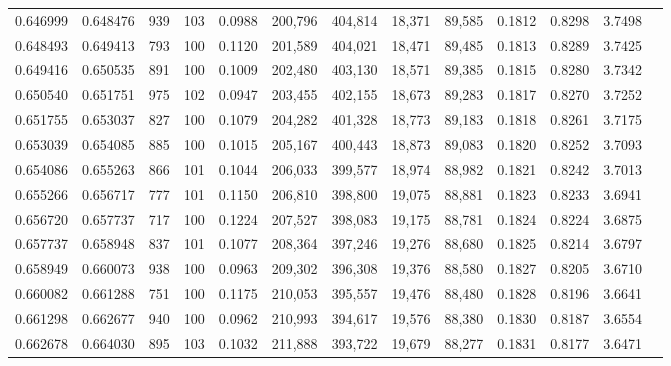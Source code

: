 \begin{tabular}{rrrrrrrrrrrrr}
0.646999 & 0.648476 &   939 & 103 &                                     0.0988 & 200,796 & 404,814 &  18,371 &  89,585 & 0.1812 & 0.8298 & 3.7498 \\
0.648493 & 0.649413 &   793 & 100 &                                     0.1120 & 201,589 & 404,021 &  18,471 &  89,485 & 0.1813 & 0.8289 & 3.7425 \\
0.649416 & 0.650535 &   891 & 100 &                                     0.1009 & 202,480 & 403,130 &  18,571 &  89,385 & 0.1815 & 0.8280 & 3.7342 \\
0.650540 & 0.651751 &   975 & 102 &                                     0.0947 & 203,455 & 402,155 &  18,673 &  89,283 & 0.1817 & 0.8270 & 3.7252 \\
0.651755 & 0.653037 &   827 & 100 &                                     0.1079 & 204,282 & 401,328 &  18,773 &  89,183 & 0.1818 & 0.8261 & 3.7175 \\
0.653039 & 0.654085 &   885 & 100 &                                     0.1015 & 205,167 & 400,443 &  18,873 &  89,083 & 0.1820 & 0.8252 & 3.7093 \\
0.654086 & 0.655263 &   866 & 101 &                                     0.1044 & 206,033 & 399,577 &  18,974 &  88,982 & 0.1821 & 0.8242 & 3.7013 \\
0.655266 & 0.656717 &   777 & 101 &                                     0.1150 & 206,810 & 398,800 &  19,075 &  88,881 & 0.1823 & 0.8233 & 3.6941 \\
0.656720 & 0.657737 &   717 & 100 &                                     0.1224 & 207,527 & 398,083 &  19,175 &  88,781 & 0.1824 & 0.8224 & 3.6875 \\
0.657737 & 0.658948 &   837 & 101 &                                     0.1077 & 208,364 & 397,246 &  19,276 &  88,680 & 0.1825 & 0.8214 & 3.6797 \\
0.658949 & 0.660073 &   938 & 100 &                                     0.0963 & 209,302 & 396,308 &  19,376 &  88,580 & 0.1827 & 0.8205 & 3.6710 \\
0.660082 & 0.661288 &   751 & 100 &                                     0.1175 & 210,053 & 395,557 &  19,476 &  88,480 & 0.1828 & 0.8196 & 3.6641 \\
0.661298 & 0.662677 &   940 & 100 &                                     0.0962 & 210,993 & 394,617 &  19,576 &  88,380 & 0.1830 & 0.8187 & 3.6554 \\
0.662678 & 0.664030 &   895 & 103 &                                     0.1032 & 211,888 & 393,722 &  19,679 &  88,277 & 0.1831 & 0.8177 & 3.6471 \\

\end{tabular}
